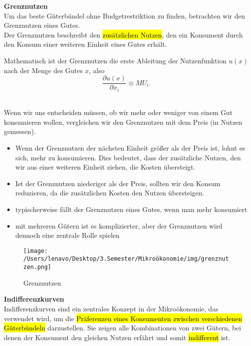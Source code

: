 \documentclass[a4paper, 10pt]{article}
\begin{document}
\noindent\textbf{Grenznutzen}\\
Um das beste Güterbündel ohne Budgetrestriktion zu finden, betrachten wir den Grenznutzen eines Gutes.\\
Der Grenznutzen beschreibt den \hl{zusätzlichen Nutzen}, den ein Konsument durch den Konsum einer weiteren Einheit eines Gutes erhält.\\[2.5mm]
\begin{definitionbox}
    Mathematisch ist der Grenznutzen die erste Ableitung der Nutzenfunktion $u(x)$ nach der Menge des Gutes $x$, also
    \begin{equation}
        \frac{\partial u(x)}{\partial x_i} \equiv MU_i. 
    \end{equation}
\end{definitionbox}\\
Wenn wir uns entscheiden müssen, ob wir mehr oder weniger von einem Gut konsumieren wollen, vergleichen wir den Grenznutzen mit dem Preis (in Nutzen gemessen).
\begin{itemize}
    \item Wenn der Grenznutzen der nächsten Einheit größer als der Preis ist, lohnt es sich, mehr zu konsumieren. Dies bedeutet, dass der zusätzliche Nutzen, den wir aus einer weiteren Einheit ziehen, die Kosten übersteigt.
    \item Ist der Grenznutzen niederiger als der Preis, sollten wir den Konsum reduzieren, da die zusätzlichen Kosten den Nutzen übersteigen.
    \item typischerweise fällt der Grenznutzen eines Gutes, wenn man mehr konsumiert
    \item mit mehreren Gütern ist es komplizierter, aber der Grenznutzen wird dennoch eine zentrale Rolle spielen
\end{itemize}
\begin{figure}
    \centering
    \texttt{[image: /Users/lenavo/Desktop/3.Semester/Mikroökonomie/img/grenznutzen.png]}
    \caption{Grenznutzen}
    \label{fig:enter-label}
\end{figure}
\textbf{Indifferenzkurven}\\
Indifferenzkurven sind ein zentrales Konzept in der Mikroökonomie, das verwendet wird, um die \hl{Präferenzen eines Konsumenten zwischen verschiedenen Güterbündeln} darzustellen. Sie zeigen alle Kombinationen von zwei Gütern, bei denen der Konsument den gleichen Nutzen erfährt und somit \hl{indifferent} ist.
\end{document}
